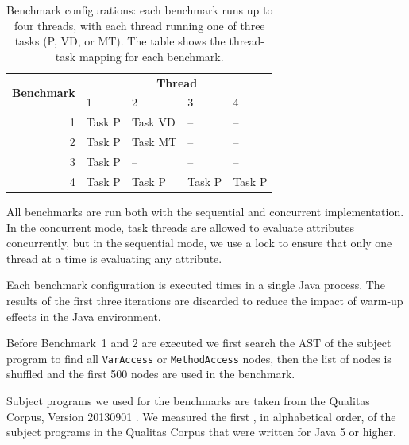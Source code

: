 {\begin{table}
\centering
\begin{tabular}{|r|l|l|l|l|}
  \hline
  \multirow{2}{*}{\textbf{Benchmark}} &
  \multicolumn{4}{c|}{\textbf{Thread}} \\
  & 1 & 2 & 3 & 4 \\
  \hline
  1 & Task P & Task VD & -- & -- \\
  \hline
  2 & Task P & Task MT & -- & -- \\
  \hline
  3 & Task P & -- & -- & -- \\
  \hline
  4 & Task P & Task P & Task P & Task P \\
  \hline
\end{tabular}
\caption{Benchmark configurations: each benchmark runs up to four threads,
with each thread running one of three tasks (P, VD, or MT).
The table shows the thread-task mapping for each benchmark.}
\label{tbl:bench-confs}
\end{table}

All benchmarks are run both with the sequential and concurrent implementation.
In the concurrent mode, task threads are allowed to evaluate attributes concurrently,
but in the sequential mode, we use a lock to ensure that only one thread at a time is
evaluating any attribute.

Each benchmark configuration is executed \benchmarkruns{} times in a single Java process.
The results of the first three iterations are discarded to reduce
the impact of warm-up effects in the Java environment.

Before Benchmark~1 and 2 are executed
we first search the AST of the subject program to find all \verb'VarAccess' or \verb'MethodAccess'
nodes, then the list of
nodes is shuffled and the first 500 nodes are used in the benchmark.



Subject programs we used for the benchmarks are taken from the Qualitas Corpus, Version 20130901
\cite{QualitasCorpus:APSEC:2010}.
We measured the first \subjectprogramcount{}, in alphabetical order, of the subject programs in the
Qualitas Corpus that were written for Java 5 or higher.



}

